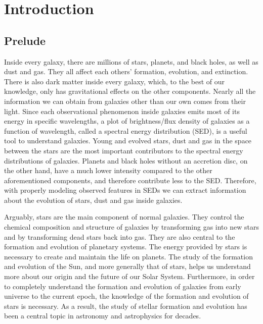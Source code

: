 
\chapter{Introduction}
\label{chap:intro}

\section{Prelude}
\label{sec: overview}
Inside every galaxy, there are millions of stars, planets, and black holes, as well as dust and gas.
They all affect each others' formation, evolution, and extinction.
There is also dark matter inside every galaxy, which, to the best of our knowledge, only has gravitational effects on the other components.
Nearly all the information we can obtain from galaxies other than our own comes from their light.
Since each observational phenomenon inside galaxies emits most of its energy in specific wavelengths, 
a plot of brightness/flux density of galaxies as a function of wavelength, called a spectral energy distribution (SED), is a useful tool to understand galaxies. 
Young and evolved stars, dust and gas in the space between the stars are the most important contributors to the spectral energy distributions of galaxies.
Planets and black holes without an accretion disc, on the other hand, have a much lower intensity compared to the other aforementioned components, and therefore contribute less to the SED.
Therefore, with properly modeling observed features in SEDs we can extract information about the evolution of stars, dust and gas inside galaxies.


Arguably, stars are the main component of normal galaxies.
They control the chemical composition and structure of galaxies by transforming gas into new stars and by transforming dead stars back into gas.
They are also central to the formation and evolution of planetary systems.
The energy provided by stars is necessary to create and maintain the life on planets. 
The study of the formation and evolution of the Sun, and more generally that of stars, helps us understand more about our origin and the future of our Solar System.
Furthermore, in order to completely understand the formation and evolution of galaxies from early universe to the current epoch, the knowledge of the formation and evolution of stars is necessary. 
As a result, the study of stellar formation and evolution has been a central topic in astronomy and astrophysics for decades.


